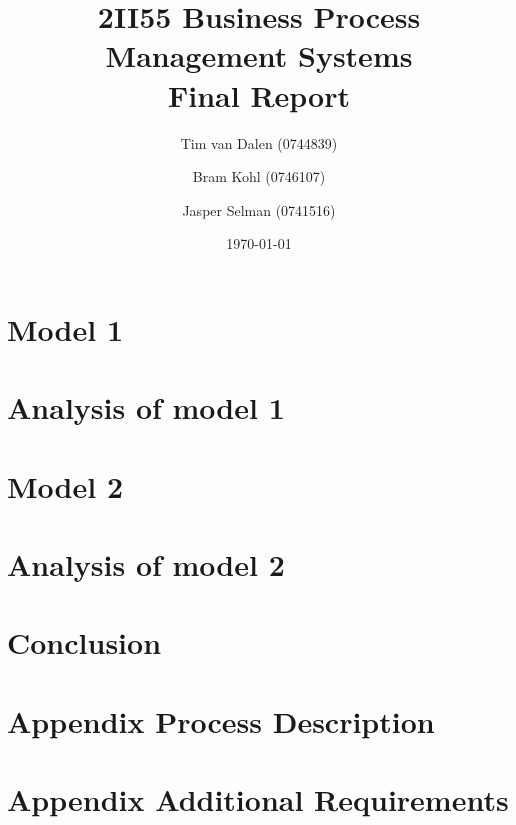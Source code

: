 \documentclass[11pt,a4paper]{article}
\title{
	{\huge 2II55 Business Process Management Systems}\\
	{\large Final Report}
}
\author{
	Tim van Dalen (0744839)
	\and
	Bram Kohl (0746107)
	\and
	Jasper Selman (0741516)
}
\date{\today}
\begin{document}
	\maketitle

	

	\section{Model 1}
	\label{sec:model1}
	

	\section{Analysis of model 1}
	\label{sec:analysis1}
	

	\section{Model 2}
	\label{sec:model2}
	

	\section{Analysis of model 2}
	\label{sec:analysis2}
	

	\section{Conclusion}
	\label{sec:conclusion}
	

	\newpage
	\begin{appendix}

	\section{Appendix Process Description}
	\label{app:appendix_exercise}
	
	
	

	\section{Appendix Additional Requirements}
	\label{app:appendix_additional}
	

	
	\end{appendix}
\end{document}
